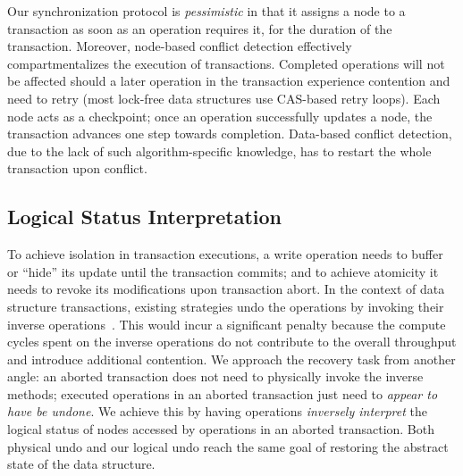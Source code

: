 \documentclass{sig-alternate-05-2015}
\begin{document}
Our synchronization protocol is \emph{pessimistic} in that it assigns a node to a transaction as soon as an operation requires it, for the duration of the transaction.
Moreover, node-based conflict detection effectively compartmentalizes the execution of transactions.
Completed operations will not be affected should a later operation in the transaction experience contention and need to retry (most lock-free data structures use CAS-based retry loops). 
Each node acts as a checkpoint; once an operation successfully updates a node, the transaction advances one step towards completion.  %
Data-based conflict detection, due to the lack of such algorithm-specific knowledge, has to restart the whole transaction upon conflict. 

\subsection{Logical Status Interpretation}
\label{sec:logical}
To achieve isolation in transaction executions, a write operation needs to buffer or ``hide'' its update until the transaction commits; and to achieve atomicity it needs to revoke its modifications upon transaction abort.
In the context of data structure transactions, existing strategies undo the operations by invoking their inverse operations~\cite{herlihy2008transactional}.
This would incur a significant penalty because the compute cycles spent on the inverse operations do not contribute to the overall throughput and introduce additional contention.
We approach the recovery task from another angle: an aborted transaction does not need to physically invoke the inverse methods; executed operations in an aborted transaction just need to \emph{appear to have be undone}.
We achieve this by having operations \emph{inversely interpret} the logical status of nodes accessed by operations in an aborted transaction.
Both physical undo and our logical undo reach the same goal of restoring the abstract state of the data structure. 
\end{document}

